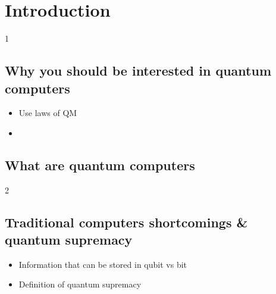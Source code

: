 \section{Introduction}
1
\subsection{Why you should be interested in quantum computers}
\begin{itemize}
\item Use laws of QM
\item 
\end{itemize}


\subsection{What are quantum computers}
2

\subsection{Traditional computers shortcomings \& quantum supremacy}
\begin{itemize}
\item Information that can be stored in qubit vs bit
\item Definition of quantum supremacy
\end{itemize}
